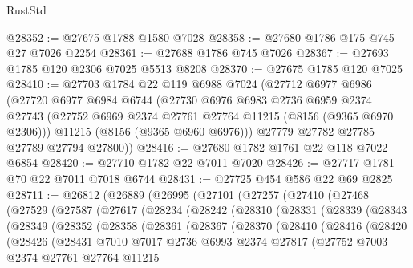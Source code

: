 \begin{lexlean}{RustStd}
\begin{coremodule}
{\begin{coremodule}
{{{{{{{{{{{{{{{{{{{{{{{{{{{{{{{{{{@28352 := @27675 @1788 @1580 @7028
@28358 := @27680 @1786 @175 @745 @27 @7026 @2254
@28361 := @27688 @1786 @745 @7026
@28367 := @27693 @1785 @120 @2306 @7025 @5513 @8208
@28370 := @27675 @1785 @120 @7025
@28410 := @27703
    @1784
    @22
    @119
    @6988
    @7024
    (@27712
      @6977
      @6986
      (@27720
        @6977
        @6984
        @6744
        (@27730
          @6976
          @6983
          @2736
          @6959
          @2374
          @27743
          (@27752 @6969 @2374 @27761 @27764 @11215 (@8156 (@9365 @6970 @2306)))
          @11215
          (@8156 (@9365 @6960 @6976)))
        @27779
        @27782
        @27785
        @27789
        @27794
        @27800))
@28416 := @27680 @1782 @1761 @22 @118 @7022 @6854
@28420 := @27710 @1782 @22 @7011 @7020
@28426 := @27717 @1781 @70 @22 @7011 @7018 @6744
@28431 := @27725 @454 @586 @22 @69 @2825
@28711 := @26812
    (@26889
      (@26995
        (@27101
          (@27257
            (@27410
              (@27468
                (@27529
                  (@27587
                    (@27617
                      (@28234
                        (@28242
                          (@28310
                            (@28331
                              (@28339
                                (@28343
                                  (@28349
                                    (@28352
                                      (@28358
                                        (@28361
                                          (@28367
                                            (@28370
                                              (@28410
                                                (@28416
                                                  (@28420
                                                    (@28426
                                                      (@28431
                                                        @7010
                                                        @7017
                                                        @2736
                                                        @6993
                                                        @2374
                                                        @27817
                                                        (@27752
                                                          @7003
                                                          @2374
                                                          @27761
                                                          @27764
                                                          @11215
}}}}}}}}}}}}}}}}}}}}}}}}}}}}}}}}}}
\end{coremodule}}
\end{coremodule}
\end{lexlean}
